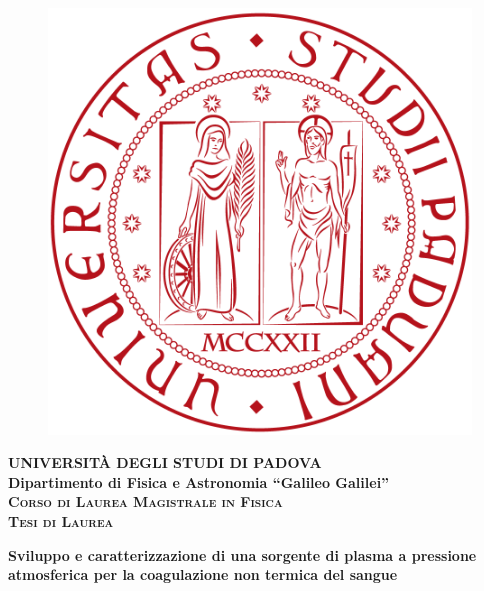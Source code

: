 \documentclass[twoside,openright,titlepage,headings,footinclude=true,cleardoublepage=empty,BCOR=5mm,11pt,a4paper,english]{book}
\begin{document}
\begin{titlepage}
\vspace{5mm}
\begin{figure}[hbtp]
\centering
\includegraphics[scale=.13]{Images/UnipdLogo.png}
\end{figure}
\vspace{5mm}
\begin{center}
{{\huge{\textsc{\bf UNIVERSIT\`A DEGLI STUDI DI PADOVA}}}\\}
\vspace{5mm}
{\Large{\bf Dipartimento di Fisica e Astronomia ``Galileo Galilei''}} \\
\vspace{5mm}
{\Large{\textsc{\bf Corso di Laurea Magistrale in Fisica}}}\\
\vspace{20mm}
{\Large{\textsc{\bf Tesi di Laurea}}}\\
\vspace{30mm}
\begin{spacing}{3}
{\LARGE \textbf{Sviluppo e caratterizzazione di una sorgente di plasma a pressione atmosferica per la coagulazione non termica del sangue​}}\\
\end{spacing}
\vspace{8mm}
\end{center}


\end{titlepage}
\end{document}
